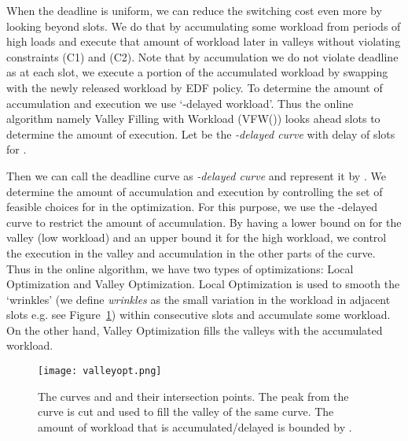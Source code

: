 \documentclass[10pt,conference,compsocconf,letterpaper]{IEEEtran}
\begin{document}
When the deadline is uniform, we can reduce the switching cost even more by looking beyond  slots. We do that by accumulating some workload from periods of high loads and execute that amount of workload later in valleys without violating constraints (C1) and (C2). Note that by accumulation we do not violate deadline as at each slot, we execute a portion of the accumulated workload by swapping with the newly released workload by EDF policy. To determine the amount of accumulation and execution we use `-delayed workload'. Thus the online algorithm namely Valley Filling with Workload (VFW()) looks ahead  slots to determine the amount of execution. Let  be the {\it -delayed curve} with delay of  slots for .

Then we can call the deadline curve as {\it -delayed curve} and represent it by . We determine the amount of accumulation and execution by controlling the set of feasible choices for  in the optimization. For this purpose, we use the -delayed curve to restrict the amount of accumulation. By having a lower bound on  for the valley (low workload) and an upper bound it for the high workload, we control the execution in the valley and accumulation in the other parts of the curve. Thus in the online algorithm, we have two types of optimizations: Local Optimization and Valley Optimization. Local Optimization is used to smooth the `wrinkles' (we define {\it wrinkles} as the small variation in the workload in adjacent slots e.g. see Figure~\ref{fig:valleyopt}) within  consecutive slots and accumulate some workload. On the other hand, Valley Optimization fills the valleys with the accumulated workload.

\begin{figure}[!t]
\begin{center}
\texttt{[image: valleyopt.png]}
\caption{The curves  and  and their intersection points. The peak from the  curve is cut and used to fill the valley of the same curve. The amount of workload that is accumulated/delayed is bounded by .}
\label{fig:valleyopt}
\end{center}
\end{figure}
\end{document}
